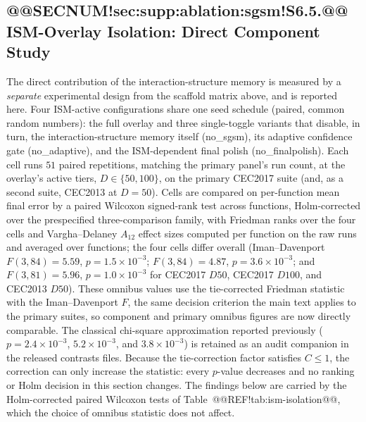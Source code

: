 \documentclass[10pt,a4paper]{article}
\begin{document}
\subsection{@@SECNUM!sec:supp:ablation:sgsm!S6.5.@@ ISM-Overlay Isolation: Direct Component Study}\label{sec:supp:ablation:sgsm}

The direct contribution of the interaction-structure memory is measured by a
\emph{separate} experimental design from the
scaffold matrix above, and is reported here.  Four ISM-active configurations
share one seed schedule (paired, common random numbers): the full overlay and
three single-toggle variants that disable, in turn, the interaction-structure
memory itself (no\_sgsm), its adaptive confidence gate
(no\_adaptive), and the ISM-dependent final polish
(no\_finalpolish).  Each cell runs $51$ paired repetitions,
matching the primary panel's run count, at the
overlay's active tiers, $D \in \{50, 100\}$, on the primary CEC2017 suite (and,
as a second suite, CEC2013 at $D = 50$).  Cells are compared on per-function
mean final error by a paired Wilcoxon signed-rank test across functions,
Holm-corrected over the prespecified three-comparison family, with Friedman
ranks over the four cells and Vargha--Delaney $A_{12}$ effect sizes computed
per function on the raw runs and averaged over functions; the four cells
differ overall (Iman--Davenport $F(3,84) = 5.59$,
$p = 1.5\times10^{-3}$; $F(3,84) = 4.87$, $p = 3.6\times10^{-3}$; and
$F(3,81) = 5.96$, $p = 1.0\times10^{-3}$ for CEC2017 $D50$, CEC2017 $D100$,
and CEC2013 $D50$).  These omnibus values use the tie-corrected Friedman
statistic with the Iman--Davenport $F$, the same decision criterion the
main text applies to the primary suites, so component and primary
omnibus figures are now directly comparable.  The classical chi-square
approximation reported previously ($p = 2.4\times10^{-3}$,
$5.2\times10^{-3}$, and $3.8\times10^{-3}$) is retained as an audit
companion in the released contrasts files.  Because the tie-correction
factor satisfies $C \leq 1$, the correction can only increase the
statistic: every $p$-value decreases and no ranking or Holm decision in
this section changes.  The findings below are carried by the
Holm-corrected paired Wilcoxon tests of Table~@@REF!tab:ism-isolation@@,
which the choice of omnibus statistic does not affect.
\end{document}
